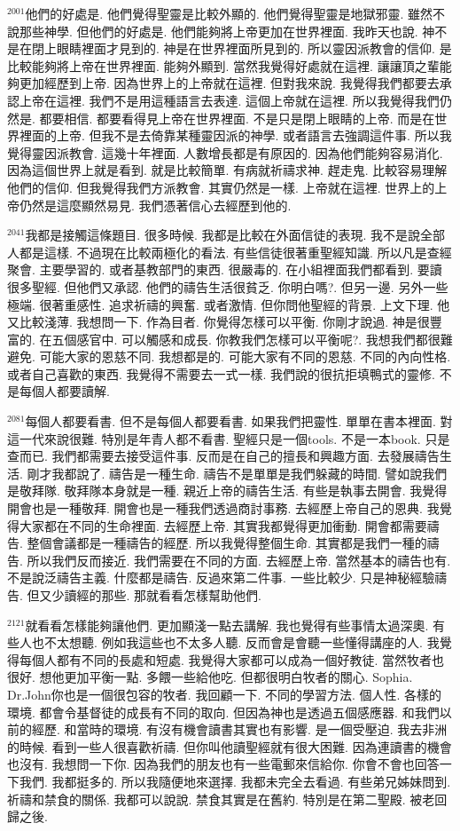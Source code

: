 \documentclass{book}
\begin{document}
$^{2001}$他們的好處是.
他們覺得聖靈是比較外顯的.
他們覺得聖靈是地獄邪靈.
雖然不說那些神學.
但他們的好處是.
他們能夠將上帝更加在世界裡面.
我昨天也說.
神不是在閉上眼睛裡面才見到的.
神是在世界裡面所見到的.
所以靈因派教會的信仰.
是比較能夠將上帝在世界裡面.
能夠外顯到.
當然我覺得好處就在這裡.
讓讓頂之輩能夠更加經歷到上帝.
因為世界上的上帝就在這裡.
但對我來說.
我覺得我們都要去承認上帝在這裡.
我們不是用這種語言去表達.
這個上帝就在這裡.
所以我覺得我們仍然是.
都要相信.
都要看得見上帝在世界裡面.
不是只是閉上眼睛的上帝.
而是在世界裡面的上帝.
但我不是去倚靠某種靈因派的神學.
或者語言去強調這件事.
所以我覺得靈因派教會.
這幾十年裡面.
人數增長都是有原因的.
因為他們能夠容易消化.
因為這個世界上就是看到.
就是比較簡單.
有病就祈禱求神.
趕走鬼.
比較容易理解他們的信仰.
但我覺得我們方派教會.
其實仍然是一樣.
上帝就在這裡.
世界上的上帝仍然是這麼顯然易見.
我們憑著信心去經歷到他的.

$^{2041}$我都是接觸這條題目.
很多時候.
我都是比較在外面信徒的表現.
我不是說全部人都是這樣.
不過現在比較兩極化的看法.
有些信徒很著重聖經知識.
所以凡是查經聚會.
主要學習的.
或者基教部門的東西.
很嚴毒的.
在小組裡面我們都看到.
要讀很多聖經.
但他們又承認.
他們的禱告生活很貧乏.
你明白嗎?.
但另一邊.
另外一些極端.
很著重感性.
追求祈禱的興奮.
或者激情.
但你問他聖經的背景.
上文下理.
他又比較淺薄.
我想問一下.
作為目者.
你覺得怎樣可以平衡.
你剛才說過.
神是很豐富的.
在五個感官中.
可以觸感和成長.
你教我們怎樣可以平衡呢?.
我想我們都很難避免.
可能大家的恩慈不同.
我想都是的.
可能大家有不同的恩慈.
不同的內向性格.
或者自己喜歡的東西.
我覺得不需要去一式一樣.
我們說的很抗拒填鴨式的靈修.
不是每個人都要讀解.

$^{2081}$每個人都要看書.
但不是每個人都要看書.
如果我們把靈性.
單單在書本裡面.
對這一代來說很難.
特別是年青人都不看書.
聖經只是一個tools.
不是一本book.
只是查而已.
我們都需要去接受這件事.
反而是在自己的擅長和興趣方面.
去發展禱告生活.
剛才我都說了.
禱告是一種生命.
禱告不是單單是我們躲藏的時間.
譬如說我們是敬拜隊.
敬拜隊本身就是一種.
親近上帝的禱告生活.
有些是執事去開會.
我覺得開會也是一種敬拜.
開會也是一種我們透過商討事務.
去經歷上帝自己的恩典.
我覺得大家都在不同的生命裡面.
去經歷上帝.
其實我都覺得更加衝動.
開會都需要禱告.
整個會議都是一種禱告的經歷.
所以我覺得整個生命.
其實都是我們一種的禱告.
所以我們反而接近.
我們需要在不同的方面.
去經歷上帝.
當然基本的禱告也有.
不是說泛禱告主義.
什麼都是禱告.
反過來第二件事.
一些比較少.
只是神秘經驗禱告.
但又少讀經的那些.
那就看看怎樣幫助他們.

$^{2121}$就看看怎樣能夠讓他們.
更加顯淺一點去講解.
我也覺得有些事情太過深奧.
有些人也不太想聽.
例如我這些也不太多人聽.
反而會是會聽一些懂得講座的人.
我覺得每個人都有不同的長處和短處.
我覺得大家都可以成為一個好教徒.
當然牧者也很好.
想他更加平衡一點.
多餵一些給他吃.
但都很明白牧者的關心.
Sophia.
Dr.John你也是一個很包容的牧者.
我回顧一下.
不同的學習方法.
個人性.
各樣的環境.
都會令基督徒的成長有不同的取向.
但因為神也是透過五個感應器.
和我們以前的經歷.
和當時的環境.
有沒有機會讀書其實也有影響.
是一個受壓迫.
我去非洲的時候.
看到一些人很喜歡祈禱.
但你叫他讀聖經就有很大困難.
因為連讀書的機會也沒有.
我想問一下你.
因為我們的朋友也有一些電郵來信給你.
你會不會也回答一下我們.
我都挺多的.
所以我隨便地來選擇.
我都未完全去看過.
有些弟兄姊妹問到.
祈禱和禁食的關係.
我都可以說說.
禁食其實是在舊約.
特別是在第二聖殿.
被老回歸之後.
\end{document}

